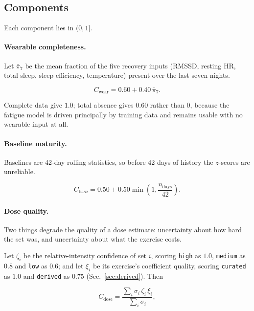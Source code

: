 \documentclass[11pt]{article}
\begin{document}
\subsection{Components}

Each component lies in $(0,1]$.

\paragraph{Wearable completeness.} Let $\bar\pi_7$ be the mean fraction of the five recovery inputs (RMSSD, resting HR, total sleep, sleep efficiency, temperature) present over the last seven nights.

\begin{equation}
C_{\mathrm{wear}}=0.60+0.40\,\bar\pi_7 .
\end{equation}

Complete data give $1.0$; total absence gives $0.60$ rather than $0$, because the fatigue model is driven principally by training data and remains usable with no wearable input at all.

\paragraph{Baseline maturity.} Baselines are 42-day rolling statistics, so before 42 days of history the $z$-scores are unreliable.

\begin{equation}
C_{\mathrm{base}}=0.50+0.50\min\!\left(1,\frac{n_{\mathrm{days}}}{42}\right).
\end{equation}

\paragraph{Dose quality.} Two things degrade the quality of a dose estimate: uncertainty about how hard the set was, and uncertainty about what the exercise costs.

Let $\zeta_i$ be the relative-intensity confidence of set $i$, scoring \texttt{high} as $1.0$, \texttt{medium} as $0.8$ and \texttt{low} as $0.6$; and let $\xi_i$ be its exercise's coefficient quality, scoring \texttt{curated} as $1.0$ and \texttt{derived} as $0.75$ (Sec.~\ref{sec:derived}). Then

\begin{equation}
C_{\mathrm{dose}}=\frac{\sum_i \sigma_i\,\zeta_i\,\xi_i}{\sum_i \sigma_i},
\end{equation}
\end{document}
